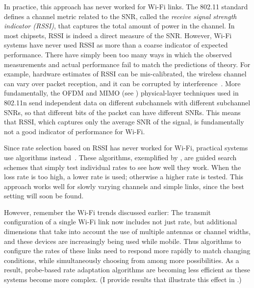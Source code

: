 In practice, this approach has never worked for Wi-Fi links. The 802.11 standard defines a channel metric related to the SNR, called the \emph{receive signal strength indicator (RSSI)}, that captures the total amount of power in the channel. In most chipsets, RSSI is indeed a direct measure of the SNR. However, Wi-Fi systems have never used RSSI as more than a coarse indicator of expected performance. There have simply been too many ways in which the observed measurements and actual performance fail to match the predictions of theory. For example, hardware estimates of RSSI can be mis-calibrated, the wireless channel can vary over packet reception, and it can be corrupted by interference~\cite{Camp_rateadapt,Judd_CHARM,Reis_interference}. More fundamentally, the OFDM and MIMO (see ) physical-layer techniques used in 802.11n send independent data on different subchannels with different subchannel SNRs, so that different bits of the packet can have different SNRs. This means that RSSI, which captures only the average SNR of the signal, is fundamentally not a good indicator of performance for Wi-Fi.

Since rate selection based on RSSI has never worked for Wi-Fi, practical systems use  algorithms instead~\cite{Bicket_SampleRate,minstrel,Wong_RRAA}. These algorithms, exemplified by , are guided search schemes that simply test individual rates to see how well they work. When the loss rate is too high, a lower rate is used; otherwise a higher rate is tested. This approach works well for slowly varying channels and simple links, since the best setting will soon be found.

However, remember the Wi-Fi trends discussed earlier: The transmit configuration of a single Wi-Fi link now includes not just rate, but additional dimensions that take into account the use of multiple antennas or channel widths, and these devices are increasingly being used while mobile. Thus algorithms to configure the rates of these links need to respond more rapidly to match changing conditions, while simultaneously choosing from among more possibilities. As a result, probe-based rate adaptation algorithms are becoming less efficient as these systems become more complex. (I provide results that illustrate this effect in .)


